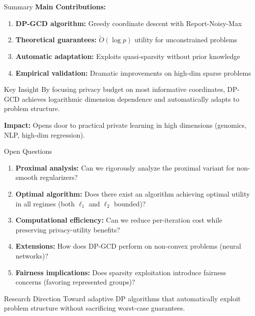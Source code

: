 \documentclass{beamer}
\begin{document}
\begin{frame}{Summary}
\textbf{Main Contributions:}
\begin{enumerate}
\item \textbf{DP-GCD algorithm:} Greedy coordinate descent with Report-Noisy-Max
\item \textbf{Theoretical guarantees:} $\widetilde{O}(\log p)$ utility for unconstrained problems
\item \textbf{Automatic adaptation:} Exploits quasi-sparsity without prior knowledge
\item \textbf{Empirical validation:} Dramatic improvements on high-dim sparse problems
\end{enumerate}

\vspace{1em}

\begin{block}{Key Insight}
By focusing privacy budget on most informative coordinates, DP-GCD achieves logarithmic dimension dependence and automatically adapts to problem structure.
\end{block}

\vspace{1em}

\textbf{Impact:} Opens door to practical private learning in high dimensions (genomics, NLP, high-dim regression).
\end{frame}

\begin{frame}{Open Questions}
\begin{enumerate}
\item \textbf{Proximal analysis:} Can we rigorously analyze the proximal variant for non-smooth regularizers?

\item \textbf{Optimal algorithm:} Does there exist an algorithm achieving optimal utility in all regimes (both $\ell_1$ and $\ell_2$ bounded)?

\item \textbf{Computational efficiency:} Can we reduce per-iteration cost while preserving privacy-utility benefits?

\item \textbf{Extensions:} How does DP-GCD perform on non-convex problems (neural networks)?

\item \textbf{Fairness implications:} Does sparsity exploitation introduce fairness concerns (favoring represented groups)?
\end{enumerate}

\vspace{1em}

\begin{alertblock}{Research Direction}
Toward adaptive DP algorithms that automatically exploit problem structure without sacrificing worst-case guarantees.
\end{alertblock}
\end{frame}
\end{document}

